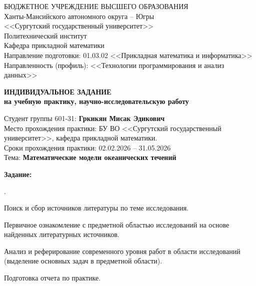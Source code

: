 \documentclass[a4paper,14pt]{extarticle}
\begin{document}

\begin{center}
    БЮДЖЕТНОЕ УЧРЕЖДЕНИЕ ВЫСШЕГО ОБРАЗОВАНИЯ \\
    Ханты-Мансийского автономного округа -- Югры \\
    <<Сургутский государственный университет>> \\
    \vspace{0.5cm}
    Политехнический институт \\
    Кафедра прикладной математики \\
    \vspace{0.5cm}
    Направление подготовки: 01.03.02 <<Прикладная математика и информатика>> \\
    Направленность (профиль): <<Технологии программирования и анализ данных>>
\end{center}

\vspace{1cm}

\begin{center}
    \textbf{\large ИНДИВИДУАЛЬНОЕ ЗАДАНИЕ} \\
    \textbf{\large на учебную практику, научно-исследовательскую работу}
\end{center}

\vspace{1cm}

\noindent Студент группы 601-31: \textbf{Гркикян Мисак Эдикович} \\
Место прохождения практики: БУ ВО <<Сургутский государственный университет>>, кафедра прикладной математики. \\
Сроки прохождения практики: 02.02.2026 -- 31.05.2026 \\
Тема: \textbf{Математические модели океанических течений}

\vspace{1cm}

\noindent \textbf{Задание:}

\begin{list}{.}{
    \setlength{\leftmargin}{1.25cm}
    \setlength{\labelsep}{0.5em}
    \setlength{\itemsep}{6pt}
    \setlength{\parsep}{0pt}
    \setlength{\topsep}{0pt}
}
    \item Поиск и сбор источников литературы по теме исследования.
    \item Первичное ознакомление с предметной областью исследований на основе найденных литературных источников.
    \item Анализ и реферирование современного уровня работ в области исследований (выделение основных задач в предметной области).
    \item Подготовка отчета по практике.
\end{list}
\end{document}
